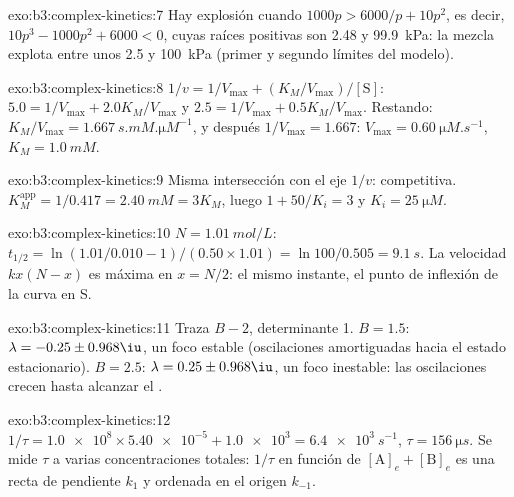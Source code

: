 \begin{solution}{exo:b3:complex-kinetics:7}
Hay explosión cuando $1000p > 6000/p + 10p^2$, es decir, $10p^3 - 1000p^2 + 6000 < 0$, cuyas raíces
positivas son 2.48 y \qty{99.9}{kPa}: la mezcla explota entre unos 2.5 y
\qty{100}{kPa} (primer y segundo límites del modelo).
\end{solution}

\begin{solution}{exo:b3:complex-kinetics:8}
$1/v = 1/V_{\max} + (K_M/V_{\max})/[\mathrm S]$: $5.0 = 1/V_{\max} + 2.0K_M/V_{\max}$ y $2.5 = 1/V_{\max} + 0.5K_M/V_{\max}$.
Restando: $K_M/V_{\max} = \qty{1.667}{s.mM.\micro M^{-1}}$, y después $1/V_{\max} = 1.667$: $V_{\max} = \qty{0.60}{\micro M.s^{-1}}$,
$K_M = \qty{1.0}{mM}$.
\end{solution}

\begin{solution}{exo:b3:complex-kinetics:9}
Misma intersección con el eje $1/v$: competitiva. $K_M^{\mathrm{app}} = 1/0.417 = \qty{2.40}{mM} = 3K_M$, luego
$1 + 50/K_i = 3$ y $K_i = \qty{25}{\micro M}$.
\end{solution}

\begin{solution}{exo:b3:complex-kinetics:10}
$N = \qty{1.01}{mol/L}$: $t_{1/2} = \ln(1.01/0.010 - 1)/(0.50 \times 1.01) = \ln100/0.505 = \qty{9.1}{s}$. La
velocidad $kx(N - x)$ es máxima en $x = N/2$: el mismo instante, el punto de inflexión de la
curva en S.
\end{solution}

\begin{solution}{exo:b3:complex-kinetics:11}
Traza $B - 2$, determinante 1. $B = 1.5$: $\lambda = -0.25 \pm 0.968\iu$, un foco estable (oscilaciones
amortiguadas hacia el estado estacionario). $B = 2.5$: $\lambda = 0.25 \pm 0.968\iu$, un foco inestable:
las oscilaciones crecen hasta alcanzar el .
\end{solution}

\begin{solution}{exo:b3:complex-kinetics:12}
$1/\tau = \num{1.0e8} \times \num{5.40e-5} + \num{1.0e3} = \qty{6.4e3}{s^{-1}}$, $\tau = \qty{156}{\micro s}$. Se mide $\tau$ a varias
concentraciones totales: $1/\tau$ en función de $[\mathrm A]_e + [\mathrm B]_e$ es una recta de pendiente $k_1$ y
ordenada en el origen $k_{-1}$.
\end{solution}

